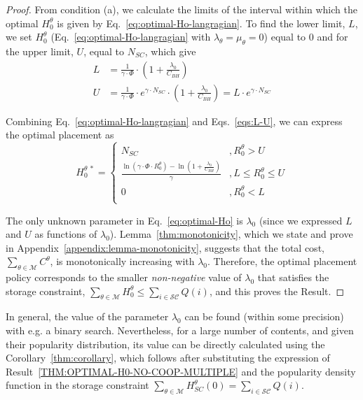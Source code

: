 \documentclass[10pt,conference,letterpaper]{IEEEtran}
\newcommand{\eq}[1]{Eq.~\eqref{#1}}
\newcommand{\eqs}[1]{Eqs.~\eqref{#1}}
\begin{document}
\begin{proof}
From condition (a), we calculate the limits of the interval within which the optimal $H_{0}^{\theta}$ is given by \eq{eq:optimal-Ho-langragian}. To find the lower limit, $L$, we set $H_{0}^{\theta}$ (\eq{eq:optimal-Ho-langragian} with $\lambda_{\theta}=\mu_{\theta}=0$) equal to $0$ and for the upper limit, $U$, equal to $N_{SC}$, which give
\begin{subequations}\label{eqs:L-U}
 \begin{align}
 L &= \frac{1}{\gamma\cdot\Phi}\cdot\left(1+\frac{\lambda_{0}}{C_{BH}}\right)		\label{eq:L-low-limit}\\
U &= \frac{1}{\gamma\cdot\Phi}\cdot e^{\gamma\cdot N_{SC}}\cdot\left(1+\frac{\lambda_{0}}{C_{BH}}\right)		\label{eq:U-upper-limit}= L\cdot e^{\gamma\cdot N_{SC}}
\end{align}
\end{subequations}

Combining \eq{eq:optimal-Ho-langragian} and \eqs{eqs:L-U}, we can express the optimal placement as
\begin{equation}\label{eq:optimal-Ho}
 H_{0}^{\theta~*} = \left\{
 \begin{array}{lc}
  N_{SC}& ,  R_{0}^{\theta}>  U\\
 \frac{\ln\left(\gamma\cdot\Phi\cdot R_{0}^{\theta}\right)-\ln\left(1+\frac{\lambda_{0}}{C_{BH}}\right)}{\gamma}& , L\leq R_{0}^{\theta}\leq U\\
  0		& , R_{0}^{\theta}< L\\
 \end{array}
 \right.
 \end{equation}

The only unknown parameter in \eq{eq:optimal-Ho} is $\lambda_{0}$ (since we expressed $L$ and $U$ as functions of $\lambda_{0}$). Lemma~\ref{thm:monotonicity}, which we state and prove in Appendix~\ref{appendix:lemma-monotonicity}, suggests that the total cost, $\sum_{\theta\in\mathcal{M}}C^{\theta}$, is monotonically increasing with $\lambda_{0}$. Therefore, the optimal placement policy corresponds to the smaller \textit{non-negative} value of $\lambda_{0}$ that satisfies the storage constraint, $\sum_{\theta\in\mathcal{M}} H_{0}^{\theta}\leq \sum_{i\in\mathcal{SC}} Q(i)$, and this proves the Result.
\end{proof}
In general, the value of the parameter $\lambda_{0}$ can be found (within some precision) with e.g. a binary search. Nevertheless, for a large number of contents, and given their popularity distribution, its value can be directly calculated using the Corollary~\ref{thm:corollary}, which follows after substituting the expression of Result~\ref{THM:OPTIMAL-H0-NO-COOP-MULTIPLE} and the popularity density function in the storage constraint $\sum_{\theta\in\mathcal{M}} H_{SC}^{\theta}(0) = \sum_{i\in\mathcal{SC}} Q(i)$.
\end{document}

